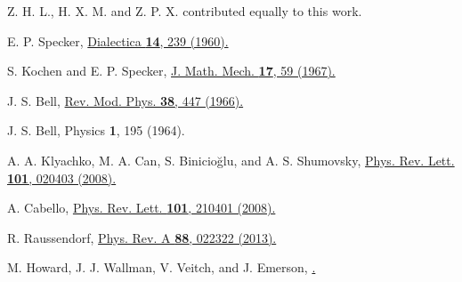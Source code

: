 \documentclass[prl,letterpaper,english,reprint,nofootinbib,aps,superscriptaddress,showpacs,showkeys]{revtex4-1}
\theoremstyle{definition}
\theoremstyle{remark}
\begin{document}
 Z. H. L., H. X. M. and Z. P. X. contributed equally to this work.



\begin{thebibliography}{10}
 E. P. Specker,
 \href{http://onlinelibrary.wiley.com/doi/10.1111/j.1746-8361.1960.tb00422.x/abstract}{Dialectica \textbf{14}, 239 (1960).}

 S. Kochen and E. P. Specker,
 \href{http://www.iumj.indiana.edu/IUMJ/fulltext.php?year=1968&volume=17&artid=17004}{J. Math. Mech. \textbf{17}, 59 (1967).}

 J. S. Bell,
 \href{http://rmp.aps.org/abstract/RMP/v38/i3/p447_1}{Rev. Mod. Phys. \textbf{38}, 447 (1966).}

 J. S. Bell,
 Physics \textbf{1}, 195 (1964).


 A. A. Klyachko, M. A. Can, S. Binicio\u{g}lu, and A. S. Shumovsky,
 \href{http://dx.doi.org/10.1103/PhysRevLett.101.020403}{Phys. Rev. Lett. \textbf{101}, 020403 (2008).}

 A. Cabello,
 \href{http://dx.doi.org/10.1103/PhysRevLett.101.210401 }{Phys. Rev. Lett. \textbf{101}, 210401 (2008).}




 R. Raussendorf,
 \href{http://link.aps.org/doi/10.1103/PhysRevA.88.022322}{Phys. Rev. A \textbf{88}, 022322 (2013).}

 M. Howard, J. J. Wallman, V. Veitch, and J. Emerson,
 \href{http://arxiv.org/abs/1401.4174}{.}



\end{thebibliography}
\end{document}
